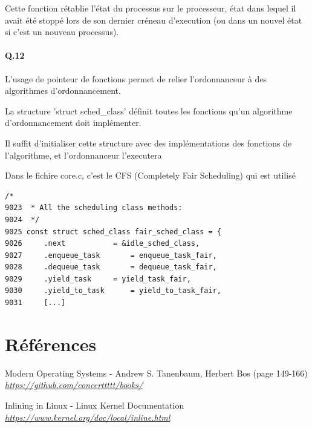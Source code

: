 \documentclass[10pt]{article}
\begin{document}
 Cette fonction rétablie l'état du processus sur le processeur, état dans lequel il avait été stoppé lors de son dernier créneau d'execution (ou dans un nouvel état si c'est un nouveau processus).

 \paragraph{Q.12}
 L'usage de pointeur de fonctions permet de relier l'ordonnanceur à des algorithmes d'ordonnancement.
 
 La structure 'struct sched_class' définit toutes les fonctions qu'un algorithme d'ordonnancement doit implémenter.
 
 Il suffit d'initialiser cette structure avec des implémentations des fonctions de l'algorithme, et l'ordonnanceur l'executera

 Dans le fichire core.c, c'est le CFS (Completely Fair Scheduling) qui est utilisé

\lstset{language=C}
\begin{lstlisting}[frame=single]
      /*
9023  * All the scheduling class methods:
9024  */ 
9025 const struct sched_class fair_sched_class = {
9026     .next           = &idle_sched_class,
9027     .enqueue_task       = enqueue_task_fair,
9028     .dequeue_task       = dequeue_task_fair,
9029     .yield_task     = yield_task_fair,
9030     .yield_to_task      = yield_to_task_fair,
9031     [...] 
\end{lstlisting}

    \newpage
    \section{Références}
    \begin{thebibliography}{}

        \label{modernos}
        Modern Operating Systems - Andrew S. Tanenbaum, Herbert Bos (page 149-166)\newline
        \href{https://github.com/concerttttt/books/blob/master/Modern Operating Systems 4th Edition--Andrew Tanenbaum.pdf}
        {\textit{https://github.com/concerttttt/books/}}\newline
	
        \label{inlinefunc}
        Inlining in Linux - Linux Kernel Documentation\newline
        \href{https://www.kernel.org/doc/local/inline.html}
        {\textit{https://www.kernel.org/doc/local/inline.html}}\newline
        
    \end{thebibliography}
    
\end{document}
